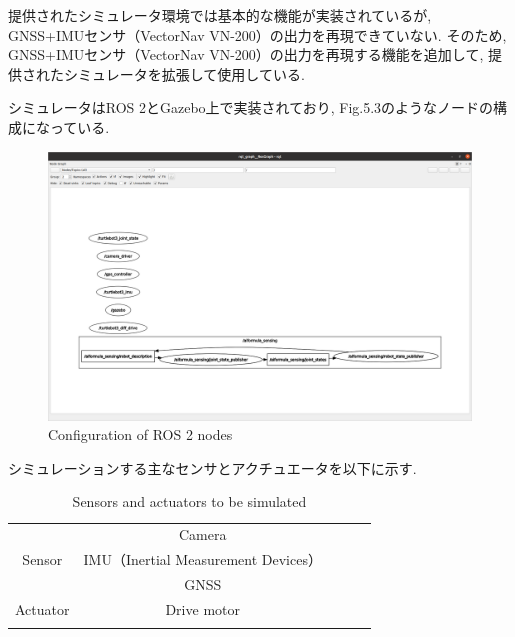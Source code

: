 \newpage

提供されたシミュレータ環境では基本的な機能が実装されているが, GNSS+IMUセンサ（VectorNav VN-200）の出力を再現できていない.
そのため, GNSS+IMUセンサ（VectorNav VN-200）の出力を再現する機能を追加して, 提供されたシミュレータを拡張して使用している.

シミュレータはROS 2とGazebo上で実装されており, Fig.5.3のようなノードの構成になっている.

\begin{figure}[H]
  \centering
 \includegraphics[keepaspectratio, scale=0.2]
      {images/rqt.png}
 \caption{Configuration of ROS 2 nodes}
 \label{fig:simulator}
\end{figure}

シミュレーションする主なセンサとアクチュエータを以下に示す.

\begin{table}[H]
  \centering
  \caption{Sensors and actuators to be simulated}
  \begin{tabular}{lclll}
  \cline{1-2}
  \multicolumn{1}{|l|}{}         & \multicolumn{1}{c|}{Camera}      &  &  &  \\
  \multicolumn{1}{|c|}{Sensor}   & \multicolumn{1}{c|}{IMU（Inertial Measurement Devices）} &  &  &  \\
  \multicolumn{1}{|l|}{}         & \multicolumn{1}{c|}{GNSS}        &  &  &  \\ \cline{1-2}
  \multicolumn{1}{|l|}{Actuator} & \multicolumn{1}{c|}{Drive motor} &  &  &  \\ \cline{1-2}
                                 & \multicolumn{1}{l}{}             &  &  & 
  \end{tabular}
\end{table}

